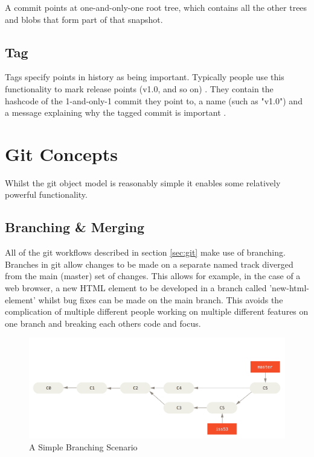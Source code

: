 \documentclass[11pt]{book}
\begin{document}
A commit points at one-and-only-one root tree, which contains all the other trees and blobs that form part of that snapshot.

\subsection{Tag}
Tags specify points in history as being important. Typically people use this functionality to mark release points (v1.0, and so on) \cite{gitdocstags}. They contain the hashcode of the 1-and-only-1 commit they point to, a name (such as "v1.0") and a message explaining why the tagged commit is important \cite{gitforcomputerscientists}.

\section{Git Concepts}
Whilst the git object model is reasonably simple it enables some relatively powerful functionality.

\subsection{Branching \& Merging}
All of the git workflows described in section \ref{sec:git} make use of branching. Branches in git allow changes to be made on a separate named track diverged from the main (master) set of changes. This allows for example, in the case of a web browser, a new HTML element to be developed in a branch called 'new-html-element' whilst bug fixes can be made on the main branch. This avoids the complication of multiple different people working on multiple different features on one branch and breaking each others code and focus.

\begin{figure}[h]
	\centering
	\includegraphics[width=\textwidth]{images/basicbranching}
	\caption{A Simple Branching Scenario \cite{gitbasicbranching}}
	\label{fig:gitbranching}
\end{figure} 
\end{document}
